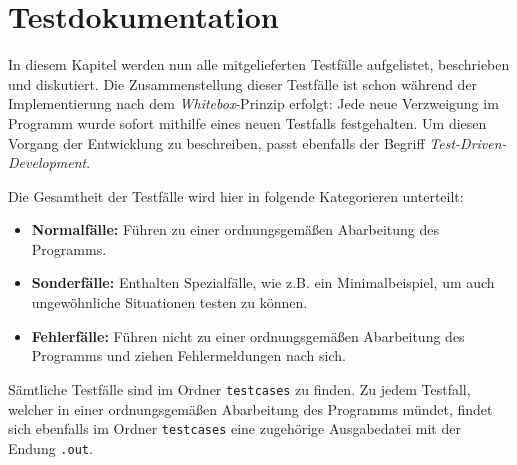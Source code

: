 \chapter{Testdokumentation}
\label{Testdokumentation}

In diesem Kapitel werden nun alle mitgelieferten Testf\"alle
aufgelistet, beschrieben und diskutiert. Die Zusammenstellung dieser
Testf\"alle ist schon w\"ahrend der Implementierung nach dem
\textit{Whitebox}-Prinzip erfolgt: Jede neue Verzweigung im Programm
wurde sofort mithilfe eines neuen Testfalls festgehalten. Um diesen
Vorgang der Entwicklung zu beschreiben, passt ebenfalls der Begriff
\textit{Test-Driven-Development}.

Die Gesamtheit der Testf\"alle wird hier in folgende Kategorieren
unterteilt:
\begin{itemize}
  \item \textbf{Normalf\"alle:} F\"uhren zu einer ordnungsgem\"a{\ss}en
    Abarbeitung des Programms.
  \item \textbf{Sonderf\"alle:} Enthalten Spezialf\"alle, wie z.B. ein
    Minimalbeispiel, um auch ungew\"ohnliche Situationen testen zu
    k\"onnen.
  \item \textbf{Fehlerf\"alle:} F\"uhren nicht zu einer
    ordnungsgem\"a{\ss}en Abarbeitung des Programms und ziehen
    Fehlermeldungen nach sich.
\end{itemize}
S\"amtliche Testf\"alle sind im Ordner \texttt{testcases} zu finden.
Zu jedem Testfall, welcher in einer ordnungsgem\"a{\ss}en Abarbeitung
des Programms m\"undet, findet sich ebenfalls im Ordner
\texttt{testcases} eine zugeh\"orige Ausgabedatei mit der Endung
\texttt{.out}.

